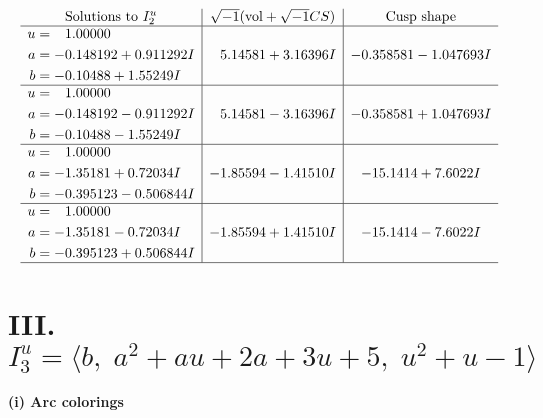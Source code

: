 \documentclass[1p]{elsarticle_modified}
\theoremstyle{definition}
\newcommand{\I}{\sqrt{-1}}
\begin{document}
$$\begin{array}{c|c|c}  
\text{Solutions to }I^u_{2}& \I (\text{vol} + \sqrt{-1}CS) & \text{Cusp shape}\\
 \hline 
\begin{aligned}
u &= \phantom{-}1.00000\phantom{ +0.000000I} \\
a &= -0.148192 + 0.911292 I \\
b &= -0.10488 + 1.55249 I\end{aligned}
 & \phantom{-}5.14581 + 3.16396 I & -0.358581 - 1.047693 I \\ \hline\begin{aligned}
u &= \phantom{-}1.00000\phantom{ +0.000000I} \\
a &= -0.148192 - 0.911292 I \\
b &= -0.10488 - 1.55249 I\end{aligned}
 & \phantom{-}5.14581 - 3.16396 I & -0.358581 + 1.047693 I \\ \hline\begin{aligned}
u &= \phantom{-}1.00000\phantom{ +0.000000I} \\
a &= -1.35181 + 0.72034 I \\
b &= -0.395123 - 0.506844 I\end{aligned}
 & -1.85594 - 1.41510 I & -15.1414 + 7.6022 I \\ \hline\begin{aligned}
u &= \phantom{-}1.00000\phantom{ +0.000000I} \\
a &= -1.35181 - 0.72034 I \\
b &= -0.395123 + 0.506844 I\end{aligned}
 & -1.85594 + 1.41510 I & -15.1414 - 7.6022 I\\
 \hline 
 \end{array}$$\newpage\newpage\renewcommand{\arraystretch}{1}
\centering \section*{III. $I^u_{3}= \langle b,\;a^2+a u+2 a+3 u+5,\;u^2+u-1 \rangle$}
\flushleft \textbf{(i) Arc colorings}\\
\end{document}
